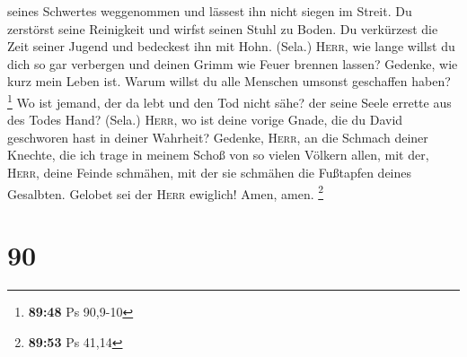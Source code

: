 seines Schwertes weggenommen und lässest ihn nicht siegen im Streit.
 Du zerstörst seine Reinigkeit und wirfst seinen Stuhl zu
Boden.  Du verkürzest die Zeit seiner Jugend und
bedeckest ihn mit Hohn. (Sela.)  \textsc{Herr}, wie lange
willst du dich so gar verbergen und deinen Grimm wie Feuer brennen
lassen?  Gedenke, wie kurz mein Leben ist. Warum willst
du alle Menschen umsonst geschaffen haben? \footnote{\textbf{89:48} Ps
  90,9-10}  Wo ist jemand, der da lebt und den Tod nicht
sähe? der seine Seele errette aus des Todes Hand? (Sela.)
 \textsc{Herr}, wo ist deine vorige Gnade, die du David
geschworen hast in deiner Wahrheit?  Gedenke,
\textsc{Herr}, an die Schmach deiner Knechte, die ich trage in meinem
Schoß von so vielen Völkern allen,  mit der,
\textsc{Herr}, deine Feinde schmähen, mit der sie schmähen die Fußtapfen
deines Gesalbten.  Gelobet sei der \textsc{Herr}
ewiglich! Amen, amen. \footnote{\textbf{89:53} Ps 41,14}

\hypertarget{section-29}{%
\section{90}\label{section-29}}


